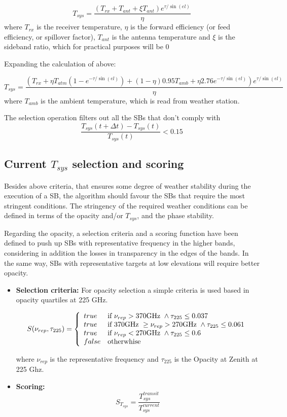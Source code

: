 \documentclass{article}
\begin{document}
\begin{enumerate}
$$
T_{sys} = \frac {\left ( T_{rx} + T_{ant} + \xi T_{ant} \right ) e^{\tau / \sin(el)}}
{\eta}
$$
where $T_{rx}$ is the receiver temperature, $\eta$ is the forward efficiency (or
feed efficiency, or spillover factor), $T_{ant}$ is the antenna temperature and $\xi$
is the sideband ratio, which for practical purposes will be $0$

Expanding the calculation of above:

$$
T_{sys} = \frac{\left ( T_{rx} + \eta T_{atm} \left ( 1 - e^{-\tau/\sin(el)} \right ) + (1 - \eta) 0.95 T_{amb} + \eta 2.76 e^{-\tau/\sin(el)} \right )  e^{\tau / \sin(el)}}
{\eta}
$$
where $T_{amb}$ is the ambient temperature, which is read from weather station.

\end{enumerate}

The selection operation filters out all the SBs that don't comply with
$$
\frac{T_{sys}(t+\Delta t) - T_{sys}(t)}{T_{sys}(t)} < 0.15
$$

\subsection{Current $T_{sys}$ selection and scoring}

Besides above criteria, that ensures some degree of weather stability during the execution
of a SB, the algorithm should
favour the SBs that require the most stringent conditions. The stringency of the
required weather conditions can be defined in terms of the opacity and/or $T_{sys}$,
and the phase stability.

Regarding the opacity, a selection criteria and a scoring function have been defined to push up SBs with
representative frequency in the higher bands, considering in addition the losses in transparency
in the edges of the bands. In the same way, SBs with representative targets
at low elevations will require better opacity.

\begin{itemize}
\item \textbf{Selection criteria:} For opacity selection a simple criteria is used based in
opacity quartiles at 225 GHz.

$$
S(\nu_{rep}, \tau_{225}) = \left\{
    \begin{array}{l l}
    true & \text{if } \nu_{rep} > 370 \text{GHz } \land \tau_{225} \leq 0.037 \\
    true & \text{if } 370 \text{GHz } \geq \nu_{rep} > 270 \text{GHz } \land \tau_{225} \leq 0.061 \\
    true & \text{if } \nu_{rep} < 270 \text{GHz } \land \tau_{225} \leq 0.6\\
    false & \text{otherwhise}
    \end{array} \right . 
$$

where $\nu_{rep}$ is the representative frequency and $\tau_{225}$ is the Opacity
at Zenith at 225 Ghz.

\item \textbf{Scoring:} 
$$
	S_{T_{sys}} = \frac{T_{sys}^{transit}}{T_{sys}^{current}}
$$
\end{itemize}
\end{document}

